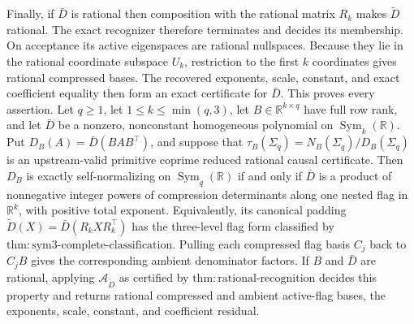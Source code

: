 Finally, if \(\bar D\) is rational then composition with the rational
matrix \(R_k\) makes \(\widetilde D\) rational.  The exact recognizer
therefore terminates and decides its membership.  On acceptance its
active eigenspaces are rational nullspaces.  Because they lie in the
rational coordinate subspace \(U_k\), restriction to the first \(k\)
coordinates gives rational compressed bases.  The recovered exponents,
scale, constant, and exact coefficient equality then form an exact
certificate for \(\bar D\).  This proves every assertion.
Let \(q\geq1\), let \(1\leq k\leq\min(q,3)\), let
\(B\in\mathbb R^{k\times q}\) have full row rank, and let \(\bar D\)
be a nonzero, nonconstant homogeneous polynomial on
\(\operatorname{Sym}_k(\mathbb R)\).  Put
\(D_B(A)=\bar D(BAB^{\top})\), and suppose that
\(\tau_B(\Sigma_q)=N_B(\Sigma_q)/D_B(\Sigma_q)\) is an upstream-valid
primitive coprime reduced rational causal certificate.  Then \(D_B\) is
exactly self-normalizing on \(\operatorname{Sym}_q(\mathbb R)\) if and
only if \(\bar D\) is a product of nonnegative integer powers of
compression determinants along one nested flag in \(\mathbb R^k\),
with positive total exponent.  Equivalently, its canonical padding
\(\widetilde D(X)=\bar D(R_kXR_k^{\top})\) has the three-level flag form
classified by \(\mathrm{thm{:}sym3\text{-}complete\text{-}classification}\).
Pulling each compressed flag basis \(C_j\) back to \(C_jB\) gives the
corresponding ambient denominator factors.  If \(B\) and \(\bar D\)
are rational, applying \(\mathcal A_{\widetilde D}\) as certified by
\(\mathrm{thm{:}rational\text{-}recognition}\) decides this property and
returns rational compressed and ambient active-flag bases, the
exponents, scale, constant, and coefficient residual.

